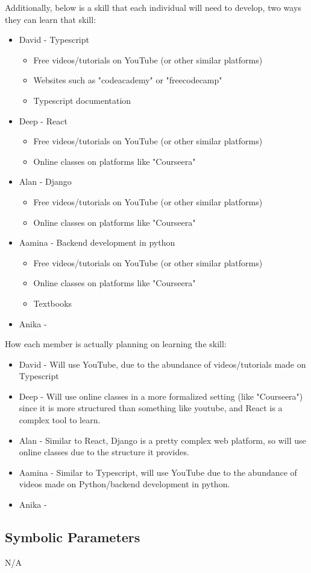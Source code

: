 \documentclass[12pt, titlepage]{article}
\begin{document}
Additionally, below is a skill that each individual will need to develop, two ways they can learn that skill:\\
\begin{itemize}
    \item David - Typescript
    \begin{itemize}
        \item Free videos/tutorials on YouTube (or other similar platforms)
        \item Websites such as "codeacademy" or "freecodecamp"
        \item Typescript documentation
    \end{itemize}
    \item Deep - React
    \begin{itemize}
        \item Free videos/tutorials on YouTube (or other similar platforms)
        \item Online classes on platforms like "Courseera"
    \end{itemize}
    \item Alan - Django
    \begin{itemize}
        \item Free videos/tutorials on YouTube (or other similar platforms)
        \item Online classes on platforms like "Courseera"
    \end{itemize}
    \item Aamina - Backend development in python
    \begin{itemize}
        \item Free videos/tutorials on YouTube (or other similar platforms)
        \item Online classes on platforms like "Courseera"
        \item Textbooks
    \end{itemize}
    \item Anika - 
\end{itemize}

How each member is actually planning on learning the skill:\\
\begin{itemize}
    \item David - Will use YouTube, due to the abundance of videos/tutorials made on Typescript
    \item Deep - Will use online classes in a more formalized setting (like "Courseera") since it is more structured than something like youtube, and React is a complex tool to learn.
    \item Alan - Similar to React, Django is a pretty complex web platform, so will use online classes due to the structure it provides.
    \item Aamina - Similar to Typescript, will use YouTube due to the abundance of videos made on Python/backend development in python.
    \item Anika - 
\end{itemize}



\subsection{Symbolic Parameters}

N/A
\end{document}
